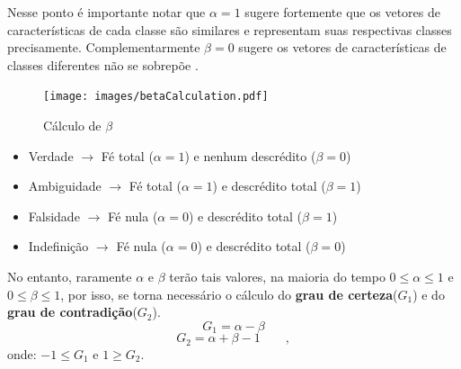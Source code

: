 \begin{myenv}{1.5}
					\par Nesse ponto é importante notar que $\alpha=1$ sugere fortemente que os vetores de características de cada classe são similares e representam suas respectivas classes precisamente. Complementarmente $\beta=0$ sugere os vetores de características de classes diferentes não se sobrepõe \cite{8588433}.
					
					\begin{figure}[h]
						\centering
						\texttt{[image: images/betaCalculation.pdf]}
						\caption{Cálculo de $\beta$}
						\label{fig:betacalculation}
					\end{figure}
					
					\begin{itemize}
						\item Verdade $\rightarrow$ Fé total ($\alpha = 1$) e nenhum descrédito ($\beta = 0$)
						\item Ambiguidade $\rightarrow$ Fé total ($\alpha = 1$) e descrédito total ($\beta = 1$)
						\item Falsidade $\rightarrow$ Fé nula ($\alpha = 0$) e descrédito total ($\beta = 1$)
						\item Indefinição $\rightarrow$ Fé nula ($\alpha = 0$) e descrédito total ($\beta = 0$)
					\end{itemize}
					
					\par No entanto, raramente $\alpha$ e $\beta$ terão tais valores, na maioria do tempo $0 \leqslant \alpha \leqslant 1$ e $0 \leqslant \beta \leqslant 1$, por isso, se torna necessário o cálculo do \textbf{grau de certeza}($G_1$) e do \textbf{grau de contradição}($G_2$).
					\begin{equation}
						G_1=\alpha-\beta 
					\end{equation}
					\begin{equation}
						G_2=\alpha+\beta-1 \qquad,
					\end{equation}
				onde: $-1 \leqslant G_1$ e  $1 \geqslant G_2$.


\end{myenv}
